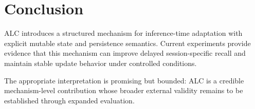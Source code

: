 \section{Conclusion}
ALC introduces a structured mechanism for inference-time adaptation with explicit mutable state and persistence semantics. Current experiments provide evidence that this mechanism can improve delayed session-specific recall and maintain stable update behavior under controlled conditions.

The appropriate interpretation is promising but bounded: ALC is a credible mechanism-level contribution whose broader external validity remains to be established through expanded evaluation.
